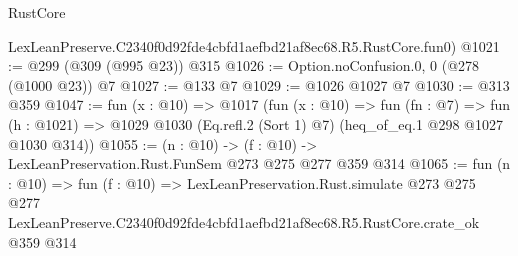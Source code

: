 \begin{lexlean}{RustCore}
\begin{coremodule}
    LexLeanPreserve.C2340f0d92fde4cbfd1aefbd21af8ec68.R5.RustCore.fun0)
@1021 := @299 (@309 (@995 @23)) @315
@1026 := Option.noConfusion.{0, 0} (@278 (@1000 @23)) @7
@1027 := @133 @7
@1029 := @1026 @1027 @7
@1030 := @313 @359
@1047 := fun (x : @10) =>
  @1017
    (fun (x : @10) =>
    fun (fn : @7) =>
    fun (h : @1021) => @1029 @1030 (Eq.refl.{2} (Sort 1) @7) (heq_of_eq.{1} @298 @1027 @1030 @314))
@1055 := (n : @10) -> (f : @10) -> LexLeanPreservation.Rust.FunSem @273 @275 @277 @359 @314
@1065 := fun (n : @10) =>
  fun (f : @10) =>
  LexLeanPreservation.Rust.simulate
    @273
    @275
    @277
    LexLeanPreserve.C2340f0d92fde4cbfd1aefbd21af8ec68.R5.RustCore.crate_ok
    @359
    @314
\end{coremodule}
\end{lexlean}
